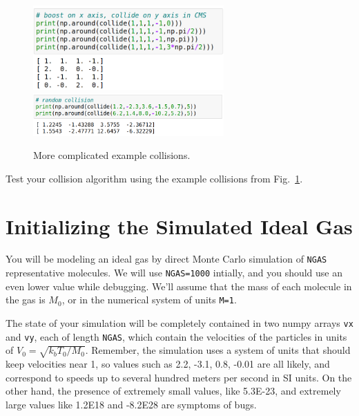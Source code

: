 \begin{figure}[htbp]
\begin{center}
  \includegraphics[width=0.65\textwidth]{figs/maxwellboltzman/collxy.png} \\
  \includegraphics[width=0.65\textwidth]{figs/maxwellboltzman/collrand.png} \\
  \caption{More complicated example collisions.}
\label{fig:collcomp}
\end{center}
\end{figure}

\begin{plot} \end{plot}  Test your collision algorithm using the  example collisions from Fig.~\ref{fig:collcomp}.

\section{Initializing the Simulated Ideal Gas}

You will be modeling an ideal gas by direct Monte Carlo simulation of
{\tt NGAS} representative molecules.  We will use {\tt NGAS=1000}
intially, and you should use an even lower value while debugging.
We'll assume that the mass of each molecule in the gas is $M_0$,
or in the numerical system of units {\tt M=1}.

The state of your simulation will be completely contained in two numpy
arrays {\tt vx} and {\tt vy}, each of length {\tt NGAS}, which contain
the velocities of the particles in units of $V_0 = \sqrt{k_b T_0 /
  M_0}$.  Remember, the simulation uses a system of units that should
keep velocities near 1, so values such as 2.2, -3.1, 0.8, -0.01 are
all likely, and correspond to speeds up to several hundred meters per
second in SI units.  On the other hand, the presence of extremely
small values, like 5.3E-23, and extremely large values like 1.2E18 and
-8.2E28 are symptoms of bugs.

